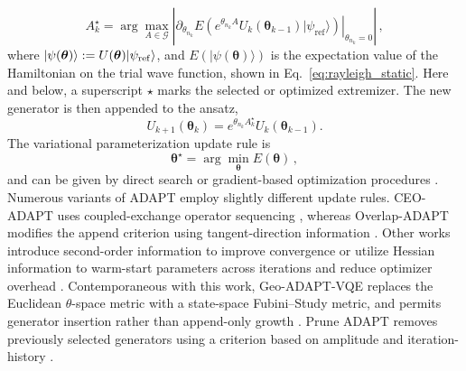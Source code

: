\documentclass[
  reprint,
  amsmath,
  amssymb,
  aps,
  pra,
  nofootinbib,
  superscriptaddress,
  floatfix
]{revtex4-2}
\newcommand{\ket}[1]{|#1\rangle}
\begin{document}
\begin{equation}
A_k^\star=\arg\max_{A\in\mathcal G}
\left|
\left.
\partial_{\theta_{n_k}}E\!\left(e^{\theta_{n_k} A}U_k(\boldsymbol{\theta}_{k-1})\ket{\psi_{\mathrm{ref}}}\right)
\right|_{\theta_{n_k}=0}
\right|\,,
\label{eq:adapt_append_gradient}
\end{equation}
where $\ket{\psi(\boldsymbol{\theta})}:=U(\boldsymbol{\theta})\ket{\psi_{\rm ref}}$, and $E(\ket{\psi(\boldsymbol{\theta})})$ is the expectation value of the Hamiltonian on the trial wave function, shown in Eq.~\eqref{eq:rayleigh_static}. Here and below, a superscript $\star$ marks the selected or optimized extremizer. The new generator is then appended to the ansatz,
\begin{equation*}
U_{k+1}(\boldsymbol{\theta}_{k})=e^{\theta_{n_k} A_k^\star}U_k(\boldsymbol{\theta}_{k-1}).
\end{equation*}
The variational parameterization update rule is
\begin{equation}
\label{eq:theta_opt}
\boldsymbol{\theta}^\star=\arg\min_{\boldsymbol{\theta}}E(\boldsymbol{\theta})\,,
\end{equation}
%
and can be given by direct search or gradient-based optimization procedures \cite{BonetMonroig2023Optimizer,Singh2023Optimizers,Gacon2021QNSPSA}. Numerous variants of ADAPT employ slightly different update rules. CEO-ADAPT uses coupled-exchange operator sequencing \cite{Ramoa2025}, whereas Overlap-ADAPT modifies the append criterion using tangent-direction information \cite{Feniou2023}. Other works introduce second-order information to improve convergence \cite{Grimsley2023ADAPT} or utilize Hessian information to warm-start parameters across iterations and reduce optimizer overhead \cite{Ramoa2025HessianRecycling}.
Contemporaneous with this work, Geo-ADAPT-VQE replaces the Euclidean \(\theta\)-space metric with a state-space Fubini--Study metric, and permits generator insertion rather than append-only growth \cite{Sohail2026GeoADAPT}. Prune ADAPT removes previously selected generators using a criterion based on amplitude and iteration-history \cite{Vaquero2025PrunedADAPT}.
\end{document}
